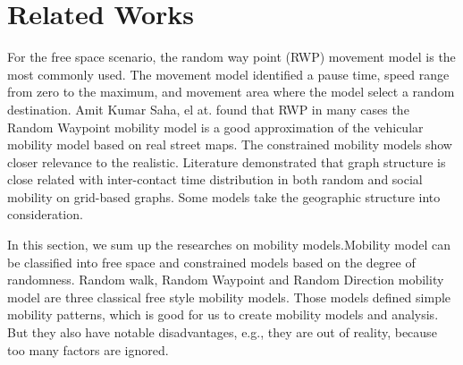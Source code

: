 \section{Related Works}
\label{section_related_works}

For the free space scenario, the random way point (RWP)\cite{broch1998performance} movement model is the most commonly used. The movement model identified a pause time, speed range from zero to the maximum, and movement area where the model select a random destination. Amit Kumar Saha, el at. \cite{SahaJohnson-91} found that RWP in many cases the Random Waypoint mobility model is a good approximation of the vehicular mobility model based on real street maps.
The constrained mobility models show closer relevance to the realistic. Literature \cite{MayerWaldhorst-108} demonstrated that graph structure is close related with inter-contact time distribution in both random and social mobility on grid-based graphs. Some models \cite{SahaJohnson-91,PengDong-101,HuangZhu-88,MartinezCano-87,ChoffnesBustamante-93} take the geographic structure into consideration. 

In this section,  we sum up the researches on mobility models.Mobility model can be classified into free space and constrained models\cite{LuChen-104,AhmedKarmakar-106} based on the degree of randomness.
Random walk, Random Waypoint and Random Direction mobility model are three classical free style mobility models. Those models defined simple mobility patterns, which is good for us to create mobility models and analysis. But they also have notable disadvantages, e.g., they  are out of reality, because too many factors are ignored. 

